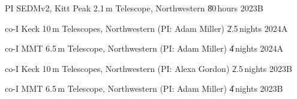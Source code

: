 


\begin{cventries}

\cvsimpentry
	{PI}
	{SEDMv2, Kitt Peak 2.1\,m Telescope, Northwestern \| 80\,hours}
	{2023B}
	{}

\cvsimpentry
	{co-I}
	{Keck 10\,m Telescopes, Northwestern (PI: Adam Miller) \| 2.5\,nights}
	{2024A}
	{}

\cvsimpentry
	{co-I}
	{MMT 6.5\,m Telescope, Northwestern (PI: Adam Miller) \| 4\,nights}
	{2024A}
	{}

\cvsimpentry
	{co-I}
	{Keck 10\,m Telescopes, Northwestern (PI: Alexa Gordon) \| 2.5\,nights}
	{2023B}
	{}

\cvsimpentry
	{co-I}
	{MMT 6.5\,m Telescope, Northwestern (PI: Adam Miller) \| 4\,nights}
	{2023B}
	{}


\end{cventries}